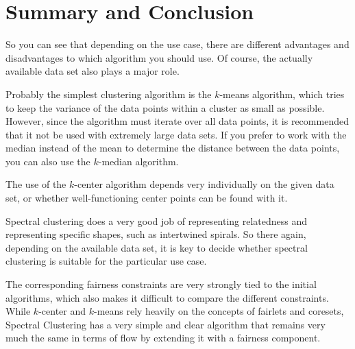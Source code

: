 \section{Summary and Conclusion}

So you can see that depending on the use case, there are different advantages and disadvantages to which algorithm you should use. Of course, the actually available data set also plays a major role.

Probably the simplest clustering algorithm is the $k$-means algorithm, which tries to keep the variance of the data points within a cluster as small as possible. However, since the algorithm must iterate over all data points, it is recommended that it not be used with extremely large data sets.
If you prefer to work with the median instead of the mean to determine the distance between the data points, you can also use the $k$-median algorithm.

The use of the $k$-center algorithm depends very individually on the given data set, or whether well-functioning center points can be found with it.

Spectral clustering does a very good job of representing relatedness and representing specific shapes, such as intertwined spirals. So there again, depending on the available data set, it is key to decide whether spectral clustering is suitable for the particular use case.

The corresponding fairness constraints are very strongly tied to the initial algorithms, which also makes it difficult to compare the different constraints. While $k$-center and $k$-means rely heavily on the concepts of fairlets and coresets, Spectral Clustering has a very simple and clear algorithm that remains very much the same in terms of flow by extending it with a fairness component.